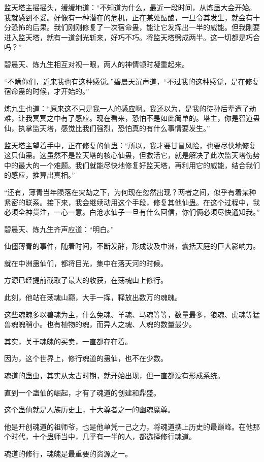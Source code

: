 \begin{this_body}
监天塔主摇摇头，缓缓地道：“不知道为什么，最近一段时间，从炼蛊大会开始。我就感到不妥。好像有一种潜在的危机，正在某处酝酿，一旦令其发生，就会有十分恐怖的后果。我们刚刚修复了一次宿命蛊，能让它发挥出一半的威能。但我刚要进入监天塔，就有一道剑光斩来，好巧不巧。将监天塔劈成两半。这一切都是巧合吗？”

碧晨天、炼九生相互对视一眼，两人的神情顿时凝重起来。

“不瞒你们，近来我也有这种感觉。”碧晨天沉声道，“不过我的这种感觉，是在修复宿命蛊的时候，才开始的。”

炼九生也道：“原来这不只是我一人的感应啊。我还以为，是我的徒孙后辈遭了劫难，让我冥冥之中有了感应。现在看来，恐怕不是如此简单的。塔主，你是智道蛊仙，执掌监天塔，感觉比我们强烈，恐怕真的有什么事情要发生。”

监天塔主望着手中，正在修复的仙蛊：“所以，我才要甘冒风险，也要尽快地修复这只仙蛊。这虽然不是监天塔的核心仙蛊，但救活它，就是解决了此次监天塔伤势中的最大的一个难题。我们就能尽快地修复好监天塔，再利用它的威能，结合我们的感应，推算出真相。”

“还有，薄青当年陨落在灾劫之下，为何现在忽然出现？两者之间，似乎有着某种紧密的联系。接下来，我会继续动用这个手段，修复其他仙蛊。在这个过程中，我必须全神贯注，一心一意。白沧水仙子一旦有什么回信，你们俩必须尽快通知我。”

碧晨天、炼九生齐声应道：“明白。”

仙僵薄青的事件，随着时间，不断发酵，形成波及中洲，囊括天庭的巨大影响力。

就在中洲蛊仙们，都将目光，集中在落天河的时候。

方源已经提前截取了最大的收获，在荡魂山上修行。

此刻，他站在荡魂山巅，大手一挥，释放出数万的魂魄。

这些魂魄多以兽魂为主，什么兔魂、羊魂、马魂等等，数量最多，狼魂、虎魂等猛兽魂魄稍小。也有植物的魂，而异人之魂、人魂的数量最少。

其实，关于魂魄的买卖，一直都存在着。

因为，这个世界上，修行魂道的蛊仙，也不在少数。

魂道的蛊虫，其实从太古时期，就开始出现，但一直都没有形成系统。

直到一个蛊仙的崛起，才有了魂道的创建和鼎盛。

这个蛊仙就是人族历史上，十大尊者之一的幽魂魔尊。

他是开创魂道的祖师爷，也是他单凭一己之力，将魂道携上历史的最巅峰。在他那个时代，十个蛊师当中，几乎有一半的人，都选择修行魂道。

魂道的修行，魂魄是最重要的资源之一。


\end{this_body}
